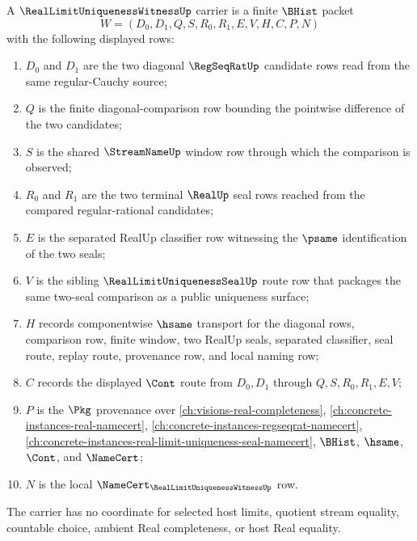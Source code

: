 \begin{definition}
\label{def:real-limit-uniqueness-witness-carrier}
A $\RealLimitUniquenessWitnessUp$ carrier is a finite $\BHist$ packet
$$
W=(D_0,D_1,Q,S,R_0,R_1,E,V,H,C,P,N)
$$
with the following displayed rows:
\begin{enumerate}
\item $D_0$ and $D_1$ are the two diagonal $\RegSeqRatUp$ candidate rows read from the same regular-Cauchy source;
\item $Q$ is the finite diagonal-comparison row bounding the pointwise difference of the two candidates;
\item $S$ is the shared $\StreamNameUp$ window row through which the comparison is observed;
\item $R_0$ and $R_1$ are the two terminal $\RealUp$ seal rows reached from the compared regular-rational candidates;
\item $E$ is the separated RealUp classifier row witnessing the $\psame$ identification of the two seals;
\item $V$ is the sibling $\RealLimitUniquenessSealUp$ route row that packages the same two-seal comparison as a public uniqueness surface;
\item $H$ records componentwise $\hsame$ transport for the diagonal rows, comparison row, finite window, two RealUp seals, separated classifier, seal route, replay route, provenance row, and local naming row;
\item $C$ records the displayed $\Cont$ route from $D_0,D_1$ through $Q,S,R_0,R_1,E,V$;
\item $P$ is the $\Pkg$ provenance over \autoref{ch:visions-real-completeness}, \autoref{ch:concrete-instances-real-namecert}, \autoref{ch:concrete-instances-regseqrat-namecert}, \autoref{ch:concrete-instances-real-limit-uniqueness-seal-namecert}, $\BHist$, $\hsame$, $\Cont$, and $\NameCert$;
\item $N$ is the local $\NameCert_{\RealLimitUniquenessWitnessUp}$ row.
\end{enumerate}
The carrier has no coordinate for selected host limits, quotient stream equality, countable choice, ambient Real completeness, or host Real equality.
\end{definition}

